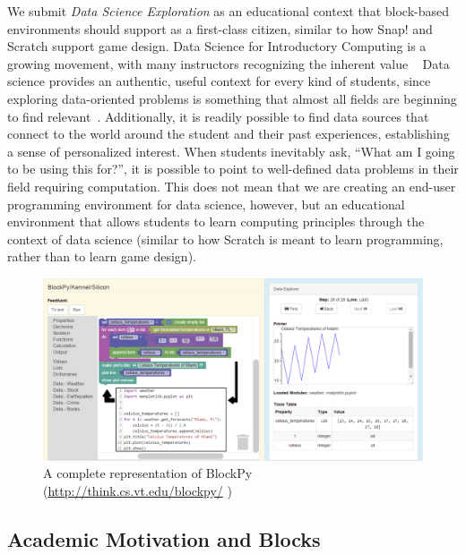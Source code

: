 \documentclass[conference]{IEEEtran}
\begin{document}
We submit \textit{Data Science Exploration} as an educational context that block-based environments should support as a first-class citizen, similar to how Snap! and Scratch support game design.
Data Science for Introductory Computing is a growing movement, with many instructors recognizing the inherent value ~\cite{Anderson, Sullivan:2013}
Data science provides an authentic, useful context for every kind of students, since exploring data-oriented problems is something that almost all fields are beginning to find relevant~\cite{Layman:2007, Social-good}.
Additionally, it is readily possible to find data sources that connect to the world around the student and their past experiences, establishing a sense of personalized interest.
When students inevitably ask, ``What am I going to be using this for?'', it is possible to point to well-defined data problems in their field requiring computation.
This does not mean that we are creating an end-user programming environment for data science, however, but an educational environment that allows students to learn computing principles through the context of data science (similar to how Scratch is meant to learn programming, rather than to learn game design).

\begin{figure}[t]
\includegraphics[width=\linewidth, keepaspectratio]{full-kennel.eps}
\caption{A complete representation of BlockPy (\url{http://think.cs.vt.edu/blockpy/} )}
\label{fig-blockpy-full}
\end{figure}

\subsection{Academic Motivation and Blocks}
\end{document}
